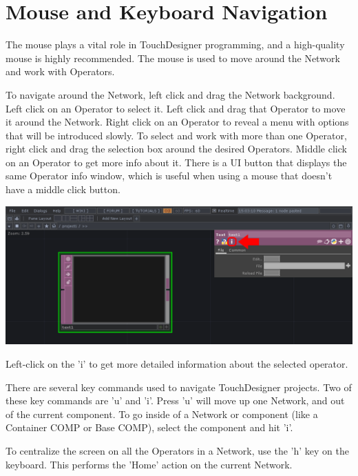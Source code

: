\section{Mouse and Keyboard Navigation}
\begin{fullwidth}
The mouse plays a vital role in TouchDesigner programming, and a high-quality mouse is highly recommended. The mouse is used to move around the Network and work with Operators. 

To navigate around the Network, left click and drag the Network background. Left click on an Operator to select it. Left click and drag that Operator to move it around the Network. Right click on an Operator to reveal a menu with options that will be introduced slowly. To select and work with more than one Operator, right click and drag the selection box around the desired Operators. Middle click on an Operator to get more info about it. There is a UI button that displays the same Operator info window, which is useful when using a mouse that doesn't have a middle click button.

\begin{center}
\includegraphics{./img/1.3/navigation-1.png}
\end{center}

Left-click on the 'i' to get more detailed information about the selected operator.

There are several key commands used to navigate TouchDesigner projects. Two of these key commands are 'u' and 'i'. Press 'u' will move up one Network, and out of the current component. To go inside of a Network or component (like a Container COMP or Base COMP), select the component and hit 'i'.

To centralize the screen on all the Operators in a Network, use the 'h' key on the keyboard. This performs the 'Home' action on the current Network. 

\end{fullwidth}


